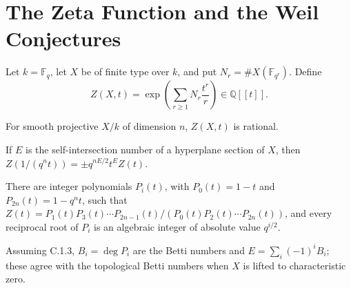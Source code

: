 \section{The Zeta Function and the Weil Conjectures}
\label{ha-appC-sec1}

\begin{definition}
Let $k=\mathbb F_q$, let $X$ be of finite type over $k$, and put
$N_r=\#X(\mathbb F_{q^r})$.  Define
\[
Z(X,t)=\exp\left(\sum_{r\ge1}N_r\frac{t^r}{r}\right)\in\mathbb Q[[t]].
\]
\end{definition}

\begin{conjecture}
\label{ha-appC-conj1-1}
For smooth projective $X/k$ of dimension $n$, $Z(X,t)$ is rational.
\end{conjecture}

\begin{conjecture}
\label{ha-appC-conj1-2}
If $E$ is the self-intersection number of a hyperplane section of $X$, then
$Z(1/(q^nt))=\pm q^{nE/2}t^E Z(t)$.
\end{conjecture}

\begin{conjecture}
\label{ha-appC-conj1-3}
There are integer polynomials $P_i(t)$, with $P_0(t)=1-t$ and
$P_{2n}(t)=1-q^nt$, such that
$Z(t)=P_1(t)P_3(t)\cdots P_{2n-1}(t)/(P_0(t)P_2(t)\cdots P_{2n}(t))$,
and every reciprocal root of $P_i$ is an algebraic integer of absolute value
$q^{i/2}$.
\end{conjecture}

\begin{conjecture}
\label{ha-appC-conj1-4}
Assuming C.1.3, $B_i=\deg P_i$ are the Betti numbers and
$E=\sum_i(-1)^iB_i$; these agree with the topological Betti numbers when
$X$ is lifted to characteristic zero.
\end{conjecture}

